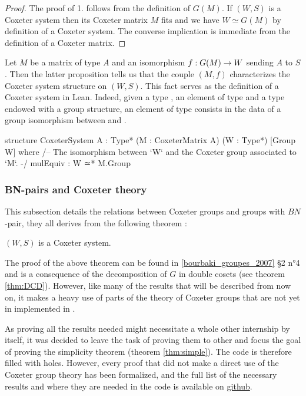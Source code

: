 \begin{proof}

The proof of 1. follows from the definition of $G\left( M \right)$.
If $\left( W,S \right)$ is a Coxeter system then its Coxeter matrix $M$ fits and we have $ W \simeq G(M)$ by definition of a Coxeter system. The converse implication is immediate from the definition of a Coxeter matrix.

\end{proof}
Let $M$ be a matrix of type $A$ and an isomorphism $f : G(M) \to W$ sending $A$ to $S$. Then the latter proposition tells us that the couple $\left( M,f \right)$ characterizes the Coxeter system structure on $\left( W,S \right)$. This fact serves as the definition of a Coxeter system in Lean. 
Indeed, given a type , an element  of type  and a type  endowed with a group structure, an element of type  consists in the data of a group isomorphism between  and .

\begin{leancode}
structure CoxeterSystem {A : Type*} (M : CoxeterMatrix A) (W : Type*) 
    [Group W] where
  /-- The isomorphism between `W` and the Coxeter group associated to `M`. -/
  mulEquiv : W ≃* M.Group
\end{leancode}


\subsubsection{BN-pairs and Coxeter theory}
\label{subsub:Coxeter2} 

This subsection details the relations between Coxeter groups and groups with $BN$-pair, they all derives from the following theorem :
\begin{theoreme} \label{thm:Coxeter}
    $\left( W,S \right)$ is a Coxeter system.
\end{theoreme}
 The proof of the above theorem can be found in \ref{bourbaki_groupes_2007} §2 n°4 and is a consequence of the decomposition of $G$ in double cosets (see theorem \ref{thm:DCD}). However, like many of the results that will be described from now on, it makes a heavy use of parts of the theory of Coxeter groups that are not yet in implemented in \Lean. 
    
 As proving all the results needed might necessitate a whole other internship by itself, it was decided to leave the task of proving them to other and focus the goal of proving the simplicity theorem (theorem \ref{thm:simple}). The \Lean code is therefore filled with holes. However, every proof that did not make a direct use of the Coxeter group theory has been formalized, and the full list of the necessary results and where they are needed in the code is available on \href{https://github.com/corent1234/BNpairs}{github}.

